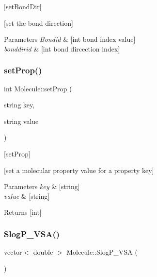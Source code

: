\mbox{[}set\+Bond\+Dir\mbox{]} 

\mbox{[}set the bond direction\mbox{]}


\begin{DoxyParams}{Parameters}
{\em Bondid} & \mbox{[}int bond index value\mbox{]} \\
\hline
{\em bonddirid} & \mbox{[}int bond dircection index\mbox{]} \\
\hline
\end{DoxyParams}
\mbox{\label{class_molecule_a25264008a24371142100f10ab7907d6f}} 
\subsubsection{\texorpdfstring{set\+Prop()}{setProp()}}
{\footnotesize\ttfamily int Molecule\+::set\+Prop (\begin{DoxyParamCaption}\item[{string}]{key,  }\item[{string}]{value }\end{DoxyParamCaption})}



\mbox{[}set\+Prop\mbox{]} 

\mbox{[}set a molecular property value for a property key\mbox{]}


\begin{DoxyParams}{Parameters}
{\em key} & \mbox{[}string\mbox{]} \\
\hline
{\em value} & \mbox{[}string\mbox{]}\\
\hline
\end{DoxyParams}
\begin{DoxyReturn}{Returns}
\mbox{[}int\mbox{]} 
\end{DoxyReturn}
\mbox{\label{class_molecule_aaf27b23a3849ca9ec2cf2df6ee591244}} 
\subsubsection{\texorpdfstring{Slog\+P\+\_\+\+V\+S\+A()}{SlogP\_VSA()}}
{\footnotesize\ttfamily vector$<$ double $>$ Molecule\+::\+Slog\+P\+\_\+\+V\+SA (\begin{DoxyParamCaption}{ }\end{DoxyParamCaption})}



